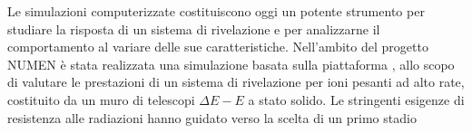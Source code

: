 
Le simulazioni computerizzate costituiscono oggi un potente strumento per studiare la risposta di un sistema di rivelazione e per analizzarne il comportamento al variare delle sue caratteristiche.
Nell'ambito del progetto NUMEN è stata realizzata una simulazione basata sulla piattaforma \geant{}, allo scopo di valutare le prestazioni di un sistema di rivelazione per ioni pesanti ad alto rate, costituito da un muro di telescopi $\Delta E - E$ a stato solido.
Le stringenti esigenze di resistenza alle radiazioni hanno guidato verso la scelta di un primo stadio 